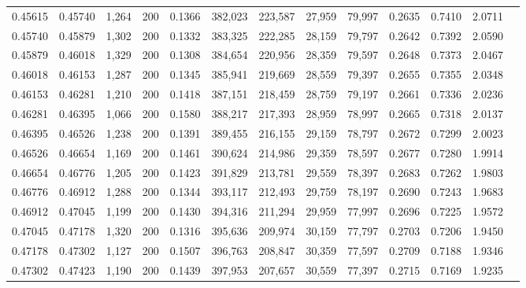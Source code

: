 \begin{tabular}{rrrrrrrrrrrrr}
0.45615 & 0.45740 &  1,264 & 200 &                                     0.1366 & 382,023 & 223,587 &  27,959 &  79,997 & 0.2635 & 0.7410 & 2.0711 \\
0.45740 & 0.45879 &  1,302 & 200 &                                     0.1332 & 383,325 & 222,285 &  28,159 &  79,797 & 0.2642 & 0.7392 & 2.0590 \\
0.45879 & 0.46018 &  1,329 & 200 &                                     0.1308 & 384,654 & 220,956 &  28,359 &  79,597 & 0.2648 & 0.7373 & 2.0467 \\
0.46018 & 0.46153 &  1,287 & 200 &                                     0.1345 & 385,941 & 219,669 &  28,559 &  79,397 & 0.2655 & 0.7355 & 2.0348 \\
0.46153 & 0.46281 &  1,210 & 200 &                                     0.1418 & 387,151 & 218,459 &  28,759 &  79,197 & 0.2661 & 0.7336 & 2.0236 \\
0.46281 & 0.46395 &  1,066 & 200 &                                     0.1580 & 388,217 & 217,393 &  28,959 &  78,997 & 0.2665 & 0.7318 & 2.0137 \\
0.46395 & 0.46526 &  1,238 & 200 &                                     0.1391 & 389,455 & 216,155 &  29,159 &  78,797 & 0.2672 & 0.7299 & 2.0023 \\
0.46526 & 0.46654 &  1,169 & 200 &                                     0.1461 & 390,624 & 214,986 &  29,359 &  78,597 & 0.2677 & 0.7280 & 1.9914 \\
0.46654 & 0.46776 &  1,205 & 200 &                                     0.1423 & 391,829 & 213,781 &  29,559 &  78,397 & 0.2683 & 0.7262 & 1.9803 \\
0.46776 & 0.46912 &  1,288 & 200 &                                     0.1344 & 393,117 & 212,493 &  29,759 &  78,197 & 0.2690 & 0.7243 & 1.9683 \\
0.46912 & 0.47045 &  1,199 & 200 &                                     0.1430 & 394,316 & 211,294 &  29,959 &  77,997 & 0.2696 & 0.7225 & 1.9572 \\
0.47045 & 0.47178 &  1,320 & 200 &                                     0.1316 & 395,636 & 209,974 &  30,159 &  77,797 & 0.2703 & 0.7206 & 1.9450 \\
0.47178 & 0.47302 &  1,127 & 200 &                                     0.1507 & 396,763 & 208,847 &  30,359 &  77,597 & 0.2709 & 0.7188 & 1.9346 \\
0.47302 & 0.47423 &  1,190 & 200 &                                     0.1439 & 397,953 & 207,657 &  30,559 &  77,397 & 0.2715 & 0.7169 & 1.9235 \\

\end{tabular}
